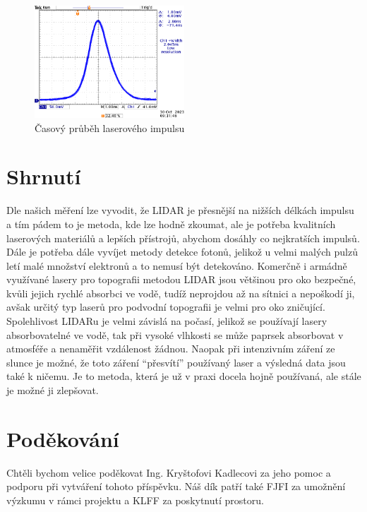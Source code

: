 \documentclass[12pt,a4paper]{article}
\begin{document}
\begin{figure}[h!]
    \centering
    \includegraphics[width=0.5\textwidth]{prubeh_impulsu.png}
    \caption{Časový průběh laserového impulsu}
\end{figure}


\section{Shrnutí}
Dle našich měření lze vyvodit, že LIDAR je přesnější na nižších délkách impulsu a tím pádem to je metoda, kde lze hodně zkoumat, ale je potřeba kvalitních laserových materiálů a lepších přístrojů, abychom dosáhly co nejkratších impulsů. Dále je potřeba dále vyvíjet metody detekce fotonů, jelikož u velmi malých pulzů letí malé množství elektronů a to nemusí být detekováno. Komerčně i armádně využívané lasery pro topografii metodou LIDAR jsou většinou pro oko bezpečné, kvůli jejich rychlé absorbci ve vodě, tudíž neprojdou až na sítnici a nepoškodí ji, avšak určitý typ laserů pro podvodní topografii je velmi pro oko zničující. Spolehlivost LIDARu je velmi závislá na počasí, jelikož se používají lasery absorbovatelné ve vodě, tak při vysoké vlhkosti se může paprsek absorbovat v atmosféře a nenaměřit vzdálenost žádnou. Naopak při intenzivním záření ze slunce je možné, že toto záření “přesvítí” používaný laser a výsledná data jsou také k ničemu.
Je to metoda, která je už v praxi docela hojně používaná, ale stále je možné ji zlepšovat.


\section*{Poděkování}
Chtěli bychom velice poděkovat Ing. Kryštofovi Kadlecovi za jeho pomoc a podporu při vytváření tohoto příspěvku.
Náš dík patří také FJFI za umožnění výzkumu v rámci projektu a KLFF za poskytnutí prostoru.
\printbibliography
\end{document}

